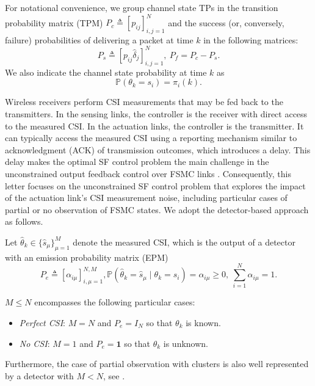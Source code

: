 \documentclass[journal,twoside,web]{ieeecolor}
\begin{document}
For notational convenience, we group
channel state TPs in the transition probability matrix (TPM) $P_{c}^{} \triangleq \left[p_{ij}\right]_{i,j=1}^{N}$
and the  success (or, conversely, failure) probabilities of delivering a packet at time $k$ in the following matrices:
\begin{equation}\label{eq:Ps}
    P_{s}^{} \triangleq \left[p_{ij}\hat{\delta}_{j}\right]_{i,j=1}^{N},~P_{f} = P_{c} - P_{s}.
\end{equation}
We also indicate the channel state probability at time $k$ as
\begin{equation}\label{eq:pik}
     \mathbb{P}(\theta_{k} = s_i) = \pi_{i}(k).
\end{equation}

Wireless receivers perform CSI measurements that may be fed back to the transmitters. In the sensing links, the controller is the receiver with direct access to the measured CSI. In the actuation links, the controller is the transmitter. It can typically access the measured CSI using a reporting mechanism similar to acknowledgment (ACK) of transmission outcomes, which introduces a delay. This delay makes the optimal SF control problem the main challenge in the unconstrained output feedback control over FSMC links \cite{impicciatore2024tac}. Consequently, this letter focuses on the unconstrained SF control problem that explores the impact of the actuation link's CSI measurement noise, including particular cases of partial or no observation of FSMC states. We adopt the detector-based approach as follows.

Let $\hat{\theta}_k \in \{\hat{s}_{\mu}\}_{\mu=1}^{M}$ denote the measured CSI, which is the output of a detector with an emission probability matrix (EPM)
\begin{subequations}
\begin{equation}\label{eq:epm}
    P_{e}^{} \triangleq \left[\alpha_{i\mu}\right]_{i,\mu=1}^{N,M},
\end{equation}
\begin{equation}\label{eq:alpha}
   \mathbb{P}(\hat{\theta}_{k} = \hat{s}_{\mu} \mid \theta_{k} = s_i) = \alpha_{i\mu} \geq 0,~ \sum_{i=1}^N \alpha_{i\mu}= 1.
\end{equation}
\end{subequations}

$M\leq N$ encompasses the following particular cases:
\begin{itemize}
    \item \emph{Perfect CSI}: $M=N$ and $P_e = I_N$ so that %
    $\theta_k$ is known.
    \item \emph{No CSI}: $M=1$ and $P_e = \mathbf{1}$ so that $\theta_k$ is unknown.
\end{itemize}
Furthermore, the case of partial observation with clusters is also well represented by a detector with $M<N$, see \cite{costa2015detector}.
\end{document}
